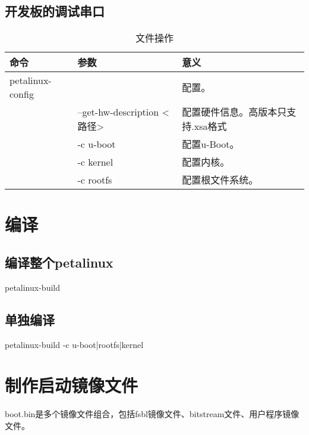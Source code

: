 \documentclass[12pt, a4paper, oneside]{ctexbook}
\newcounter{#2}
\newcounter{#2}[#1]
\numberwithin{#2}{#1}
\begin{document}
            \subsection{开发板的调试串口}
            \begin{table}[!ht] 
                \centering
                \caption{文件操作}
                \begin{tabular}{m{}<{\centering}|m{}<{\centering}|m{}<{\raggedright}}
                  \toprule[2pt]
                  {\bf 命令}&{\bf 参数}&{\bf 意义}\\
                  \toprule[1pt]
                  petalinux-config&&配置。\\\midrule
                  &--get-hw-description <路径>&配置硬件信息。高版本只支持.xsa格式\\\midrule
                  &-c u-boot&配置u-Boot。\\\midrule
                  &-c kernel&配置内核。\\\midrule
                  &-c rootfs&配置根文件系统。\\\midrule
                  \bottomrule[2pt]
                \end{tabular}
              \end{table}
              \section{编译}
              \subsection{编译整个petalinux}
              petalinux-build
              \subsection{单独编译}
              petalinux-build -c u-boot|rootfs|kernel
              \section{制作启动镜像文件}
              boot.bin是多个镜像文件组合，包括fsbl镜像文件、bitstream文件、用户程序镜像文件。
\end{document}
